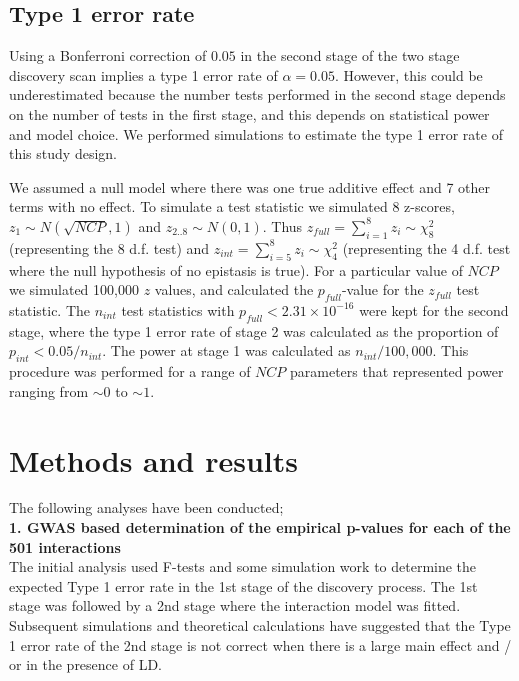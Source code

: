 \documentclass[paper=a4, fontsize=11pt]{scrartcl}         %
\numberwithin{equation}{section}                  %
\numberwithin{figure}{section}                    %
\numberwithin{table}{section}                   %
\begin{document}
\subsection*{Type 1 error rate}

Using a Bonferroni correction of $0.05$ in the second stage of the two stage discovery scan implies a type 1 error rate of $\alpha = 0.05$. However, this could be underestimated because the number tests performed in the second stage depends on the number of tests in the first stage, and this depends on statistical power and model choice. We performed simulations to estimate the type 1 error rate of this study design.

We assumed a null model where there was one true additive effect and 7 other terms with no effect. To simulate a test statistic we simulated 8 z-scores, $z_1 \sim N(\sqrt{NCP}, 1)$ and $z_{2..8} \sim N(0,1)$. Thus $z_{full} = \sum^8_{i=1}{z_i} \sim \chi^{2}_{8}$ (representing the 8 d.f. test) and $z_{int} = \sum^8_{i=5}{z_i} \sim \chi^{2}_{4}$ (representing the 4 d.f. test where the null hypothesis of no epistasis is true). For a particular value of $NCP$ we simulated 100,000 $z$ values, and calculated the $p_{full}$-value for the $z_{full}$ test statistic. The $n_{int}$ test statistics with $p_{full} < 2.31 \times 10^{-16}$ were kept for the second stage, where the type 1 error rate of stage 2 was calculated as the proportion of $p_{int} < 0.05 / n_{int}$. The power at stage 1 was calculated as $n_{int} / 100,000$. This procedure was performed for a range of $NCP$ parameters that represented power ranging from $\sim 0$ to $\sim 1$.

\newpage

\section*{Methods and results}

The following analyses have been conducted; \\

\textbf{1. GWAS based determination of the empirical p-values for each of the 501 interactions} \\

The initial analysis used F-tests and some simulation work to determine the expected Type 1 error rate in the 1st stage of the discovery process. The 1st stage was followed by a 2nd stage where the interaction model was fitted. Subsequent simulations and theoretical calculations have suggested that the Type 1 error rate of the 2nd stage is not correct when there is a large main effect and / or in the presence of LD.  \\
\end{document}
